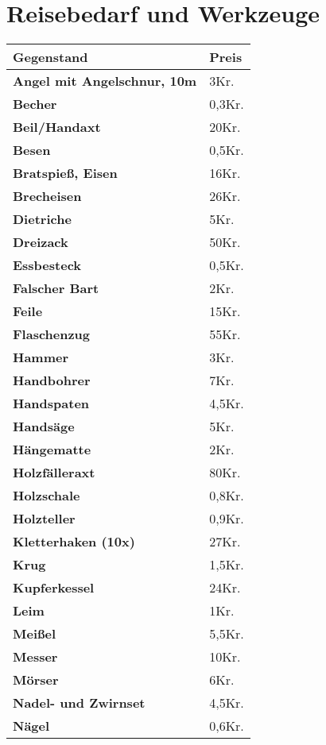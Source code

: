 \section{Reisebedarf und Werkzeuge}
\begin{longtable}{|p{5cm}|p{2cm}|}
\hline
\textbf{Gegenstand} & \textbf{Preis} \\ \hline
\textbf{Angel mit Angelschnur, 10m} & 3Kr. \\ \hline
\textbf{Becher} & 0,3Kr. \\ \hline
\textbf{Beil/Handaxt} & 20Kr. \\ \hline
\textbf{Besen} & 0,5Kr. \\ \hline
\textbf{Bratspieß, Eisen} & 16Kr. \\ \hline
\textbf{Brecheisen} & 26Kr. \\ \hline
\textbf{Dietriche} & 5Kr. \\ \hline
\textbf{Dreizack} & 50Kr. \\ \hline
\textbf{Essbesteck} & 0,5Kr. \\ \hline
\textbf{Falscher Bart} & 2Kr. \\ \hline
\textbf{Feile} & 15Kr. \\ \hline
\textbf{Flaschenzug} & 55Kr. \\ \hline
\textbf{Hammer} & 3Kr. \\ \hline
\textbf{Handbohrer} & 7Kr. \\ \hline
\textbf{Handspaten} & 4,5Kr. \\ \hline
\textbf{Handsäge} & 5Kr. \\ \hline
\textbf{Hängematte} & 2Kr. \\ \hline
\textbf{Holzfälleraxt} & 80Kr. \\ \hline
\textbf{Holzschale} & 0,8Kr. \\ \hline
\textbf{Holzteller} & 0,9Kr. \\ \hline
\textbf{Kletterhaken (10x)} & 27Kr. \\ \hline
\textbf{Krug} & 1,5Kr. \\ \hline
\textbf{Kupferkessel} & 24Kr. \\ \hline
\textbf{Leim} & 1Kr. \\ \hline
\textbf{Meißel} & 5,5Kr. \\ \hline
\textbf{Messer} & 10Kr. \\ \hline
\textbf{Mörser} & 6Kr. \\ \hline
\textbf{Nadel- und Zwirnset} & 4,5Kr. \\ \hline
\textbf{Nägel} & 0,6Kr. \\ \hline

\end{longtable}
